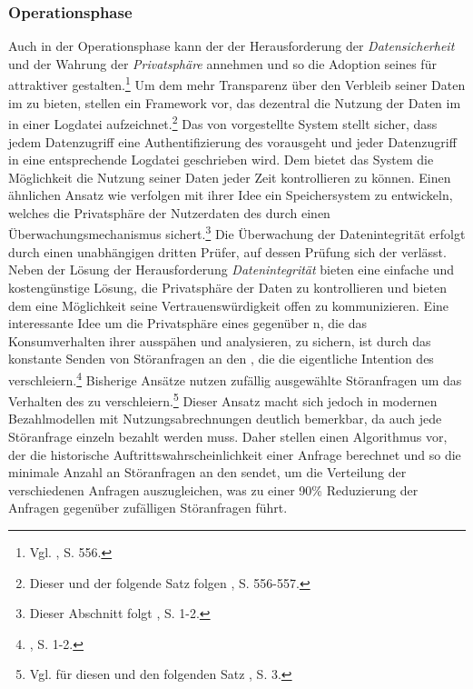 \subsubsection{Operationsphase}
Auch in der Operationsphase kann der \CSP der Herausforderung der \emph{Datensicherheit} und der Wahrung der \emph{Privatsphäre} annehmen und so die Adoption seines \CSs für \CSU attraktiver gestalten.\footnote{Vgl. \cite{Sundareswaran.2012}, S. 556.}
Um dem \CSU mehr Transparenz über den Verbleib seiner Daten im \CS zu bieten, stellen \cite{Sundareswaran.2012} ein Framework vor, das dezentral die Nutzung der Daten im \CS in einer Logdatei aufzeichnet.\footnote{Dieser und der folgende Satz folgen \cite{Sundareswaran.2012}, S. 556-557.}
Das von \cite{Sundareswaran.2012} vorgestellte System stellt sicher, dass jedem Datenzugriff eine Authentifizierung des \CSUs vorausgeht und jeder Datenzugriff in eine entsprechende Logdatei geschrieben wird.
Dem \CSU bietet das System die Möglichkeit die Nutzung seiner Daten jeder Zeit kontrollieren zu können.
\newline
Einen ähnlichen Ansatz wie \cite{Sundareswaran.2012} verfolgen \cite{Wang.2013} mit ihrer Idee ein \CC Speichersystem zu entwickeln, welches die Privatsphäre der Nutzerdaten des \CSUs durch einen Überwachungsmechanismus sichert.\footnote{Dieser Abschnitt folgt \cite{Wang.2013}, S. 1-2.}
Die Überwachung der Datenintegrität erfolgt durch einen unabhängigen dritten Prüfer, auf dessen Prüfung sich der \CSU verlässt.
Neben der Lösung der Herausforderung \emph{Datenintegrität} bieten \cite{Wang.2013} eine einfache und kostengünstige Lösung, die Privatsphäre der \CSU Daten zu kontrollieren und bieten dem \CSP eine Möglichkeit seine Vertrauenswürdigkeit offen zu kommunizieren.
\newline
Eine interessante Idee um die Privatsphäre eines \CSUs gegenüber \CSp n, die das Konsumverhalten ihrer \CSU ausspähen und analysieren, zu sichern, ist durch das konstante Senden von Störanfragen an den \Cs , die die eigentliche Intention des \CSUs verschleiern.\footnote{\cite{Zhang.2012}, S. 1-2.}\saveFN{\Zhang}
Bisherige Ansätze nutzen zufällig ausgewählte Störanfragen um das Verhalten des \CSUs zu verschleiern.\footnote{Vgl. für diesen und den folgenden Satz \cite{Zhang.2012}, S. 3.}
Dieser Ansatz macht sich jedoch in modernen \CC Bezahlmodellen mit Nutzungsabrechnungen deutlich bemerkbar, da auch jede Störanfrage einzeln bezahlt werden muss.
Daher stellen \cite{Zhang.2012} einen Algorithmus vor, der die historische Auftrittswahrscheinlichkeit einer Anfrage berechnet und so die minimale Anzahl an Störanfragen an den \CS sendet, um die Verteilung der verschiedenen Anfragen auszugleichen, was zu einer 90\% Reduzierung der Anfragen gegenüber zufälligen Störanfragen führt.\useFN{\Zhang}
